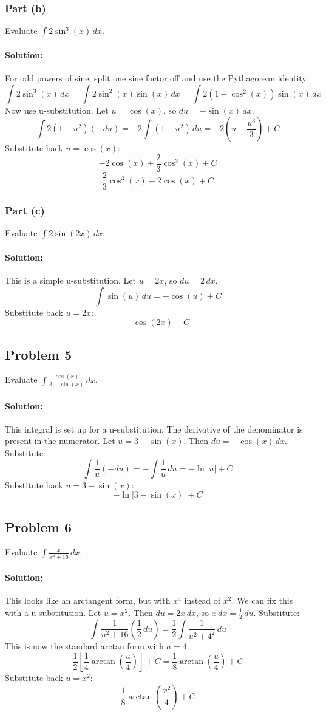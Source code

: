 \documentclass{article}
\begin{document}
\subsubsection*{Part (b)}
Evaluate $\int 2\sin^3(x) \, dx$.
\paragraph{Solution:} For odd powers of sine, split one sine factor off and use the Pythagorean identity.
\[ \int 2\sin^3(x) \, dx = \int 2\sin^2(x)\sin(x) \, dx = \int 2(1-\cos^2(x))\sin(x) \, dx \]
Now use u-substitution. Let $u = \cos(x)$, so $du = -\sin(x) \, dx$.
\[ \int 2(1-u^2)(-du) = -2 \int (1-u^2) \, du = -2 \left(u - \frac{u^3}{3}\right) + C \]
Substitute back $u = \cos(x)$:
\[ -2\cos(x) + \frac{2}{3}\cos^3(x) + C \]
\[ \boxed{\frac{2}{3}\cos^3(x) - 2\cos(x) + C} \]

\subsubsection*{Part (c)}
Evaluate $\int 2\sin(2x) \, dx$.
\paragraph{Solution:} This is a simple u-substitution.
Let $u=2x$, so $du = 2 \, dx$.
\[ \int \sin(u) \, du = -\cos(u) + C \]
Substitute back $u=2x$:
\[ \boxed{-\cos(2x) + C} \]

\subsection{Problem 5}
Evaluate $\int \frac{\cos(x)}{3 - \sin(x)} \, dx$.
\paragraph{Solution:} This integral is set up for a u-substitution. The derivative of the denominator is present in the numerator.
Let $u = 3 - \sin(x)$. Then $du = -\cos(x) \, dx$.
Substitute:
\[ \int \frac{1}{u} (-du) = -\int \frac{1}{u} \, du = -\ln|u| + C \]
Substitute back $u = 3 - \sin(x)$:
\[ \boxed{-\ln|3 - \sin(x)| + C} \]

\subsection{Problem 6}
Evaluate $\int \frac{x}{x^4 + 16} \, dx$.
\paragraph{Solution:} This looks like an arctangent form, but with $x^4$ instead of $x^2$. We can fix this with a u-substitution.
Let $u = x^2$. Then $du = 2x \, dx$, so $x \, dx = \frac{1}{2} \, du$.
Substitute:
\[ \int \frac{1}{u^2 + 16} \left(\frac{1}{2} \, du\right) = \frac{1}{2} \int \frac{1}{u^2 + 4^2} \, du \]
This is now the standard arctan form with $a=4$.
\[ \frac{1}{2} \left[ \frac{1}{4}\arctan\left(\frac{u}{4}\right) \right] + C = \frac{1}{8}\arctan\left(\frac{u}{4}\right) + C \]
Substitute back $u = x^2$:
\[ \boxed{\frac{1}{8}\arctan\left(\frac{x^2}{4}\right) + C} \]
\end{document}
